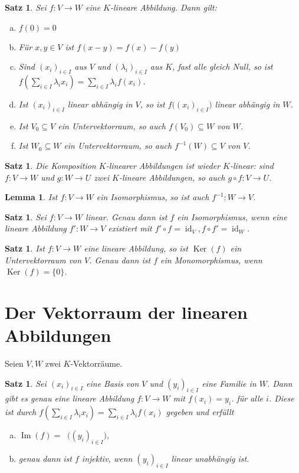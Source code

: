 \documentclass[ngerman,a4paper]{report}
\theoremstyle{changebreak}
\newtheorem{lemma}[theorem]{Lemma}
\newtheorem{satz}[theorem]{Satz}
\DeclareMathOperator{\id}{id}
\DeclareMathOperator{\Ker}{Ker}
\DeclareMathOperator{\im}{Im}
\DeclareMathOperator{\spank}{span_K}
\begin{document}
\begin{satz}
	Sei $f:V\rightarrow W$ eine $K$-lineare Abbildung. Dann gilt:
	\begin{enumerate}[(a)]
		\item $f(0) = 0$
		\item Für $x,y\in V$ ist $f(x-y) = f(x) - f(y)$
		\item Sind $(x_i)_{i\in I}$ aus $V$ und $(\lambda_i)_{i\in I}$ aus $K$, fast alle gleich Null, so ist $f(\sum_{i\in I} \lambda_i x_i) = \sum_{i\in I}\lambda_if(x_i)$.
		\item Ist $(x_i)_{i\in I}$ linear abhängig in $V$, so ist $f\big( (x_i)_{i\in I} \big)$ linear abhängig in $W$.
		\item Ist $V_0\subseteq V$ ein Untervektorraum, so auch $f(V_0)\subseteq W$ von $W$.
		\item Ist $W_0\subseteq W$ ein Untervektorraum, so auch $f^{-1}(W)\subseteq V$ von $V$.
	\end{enumerate}
\end{satz}

\begin{satz}
	Die Komposition $K$-linearer Abbildungen ist wieder $K$-linear: sind $f:V\rightarrow W$ und $g:W\rightarrow U$ zwei $K$-lineare Abbildungen, so auch $g\circ f:V\rightarrow U$.
\end{satz}

\begin{lemma}
	Ist $f:V\rightarrow W$ ein Isomorphismus, so ist auch $f^{-1}:W\rightarrow V$.
\end{lemma}

\begin{satz}
	Sei $f:V\rightarrow W$ linear. Genau dann ist $f$ ein Isomorphismus, wenn eine lineare Abbildung $f':W\rightarrow V$ existiert mit $f'\circ f=\id_V, f\circ f' = \id_W$.
\end{satz}
\addtocounter{theorem}{1}
\begin{satz}
	Ist $f:V\rightarrow W$ eine lineare Abbildung, so ist $\Ker(f)$ ein Untervektorraum von $V$. Genau dann ist $f$ ein Monomorphismus, wenn $\Ker(f) = \{0\}$.
\end{satz}

\section{Der Vektorraum der linearen Abbildungen}
Seien $V, W$ zwei $K$-Vektorräume.

\begin{satz}
	Sei $(x_i)_{i\in I}$ eine Basis von $V$ und $(y_i)_{i\in I}$ eine Familie in $W$. Dann gibt es genau eine lineare Abbildung $f:V\rightarrow W$ mit $f(x_i) = y_i$. für alle $i$. Diese ist durch $f(\sum_{i\in I} \lambda_i x_i) = \sum_{i\in I}\lambda_i f(x_i)$ gegeben und erfüllt
	\begin{enumerate}[(a)]
		\item $\im(f) = \spank\big( (y_i)_{i\in I} \big)$,
		\item genau dann ist $f$ injektiv, wenn $(y_i)_{i\in I}$ linear unabhängig ist.
	\end{enumerate}
\end{satz}
\end{document}
